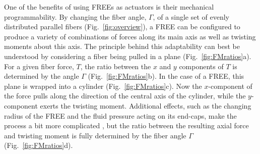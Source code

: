 

One of the benefits of using FREEs as actuators is their mechanical programmability.
By changing the fiber angle, $\Gamma$, of a single set of evenly distributed parallel fibers (Fig.~\ref{fig:overview}), a FREE can be configured to produce a variety of combinations of forces along its main axis as well as twisting moments about this axis.
The principle behind this adaptability can best be understood by considering a fiber being pulled in a plane (Fig.~\ref{fig:FMratios}a).
For a given fiber force, $T$, the ratio between the $x$ and $y$ components of $T$ is determined by the angle $\Gamma$ (Fig.~\ref{fig:FMratios}b). 
In the case of a FREE, this plane is wrapped into a cylinder (Fig.~\ref{fig:FMratios}c). 
Now the $x$-component of the force pulls along the direction of the central axis of the cylinder, while the $y$-component exerts the twisting moment.
Additional effects, such as the changing radius of the FREE and the fluid pressure acting on its end-caps, make the process a bit more complicated \cite{bruder2017model}, but the ratio between the resulting axial force and twisting moment is fully determined by the fiber angle $\Gamma$ (Fig.~\ref{fig:FMratios}d).


